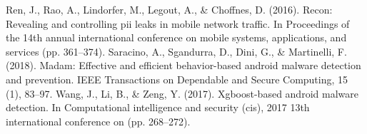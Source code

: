 \documentclass[conference]{IEEEtran}
\begin{document}
\begin{thebibliography}{00}
Ren, J., Rao, A., Lindorfer, M., Legout, A., \& Choffnes, D. (2016). Recon: Revealing and controlling pii leaks in mobile network traffic. In Proceedings of the 14th annual international conference on mobile systems, applications, and services (pp. 361–374).
Saracino, A., Sgandurra, D., Dini, G., \& Martinelli, F. (2018). Madam: Effective and efficient behavior-based android malware detection and prevention. IEEE Transactions on Dependable and Secure Computing, 15 (1), 83–97.
Wang, J., Li, B., \& Zeng, Y. (2017). Xgboost-based android malware detection. In Computational intelligence and security (cis), 2017 13th international conference on (pp. 268–272).

\end{thebibliography}
\end{document}
